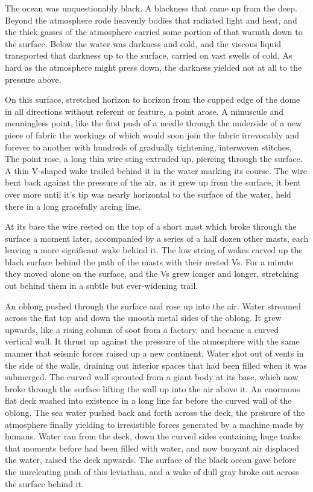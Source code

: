 \documentclass[
]{scrbook}
\begin{document}
The ocean was unquestionably black. A blackness that came up from the
deep. Beyond the atmosphere rode heavenly bodies that radiated light and
heat, and the thick gasses of the atmosphere carried some portion of
that warmth down to the surface. Below the water was darkness and cold,
and the viscous liquid transported that darkness up to the surface,
carried on vast swells of cold. As hard as the atmosphere might press
down, the darkness yielded not at all to the pressure above.

On this surface, stretched horizon to horizon from the cupped edge of
the dome in all directions without referent or feature, a point arose. A
minuscule and meaningless point, like the first push of a needle through
the underside of a new piece of fabric the workings of which would soon
join the fabric irrevocably and forever to another with hundreds of
gradually tightening, interwoven stitches. The point rose, a long thin
wire sting extruded up, piercing through the surface. A thin V-shaped
wake trailed behind it in the water marking its course. The wire bent
back against the pressure of the air, as it grew up from the surface, it
bent over more until it's tip was nearly horizontal to the surface of
the water, held there in a long gracefully arcing line.

At its base the wire rested on the top of a short mast which broke
through the surface a moment later, accompanied by a series of a half
dozen other masts, each leaving a more significant wake behind it. The
low string of wakes carved up the black surface behind the path of the
masts with their nested Vs. For a minute they moved alone on the
surface, and the Vs grew longer and longer, stretching out behind them
in a subtle but ever-widening trail.

An oblong pushed through the surface and rose up into the air. Water
streamed across the flat top and down the smooth metal sides of the
oblong. It grew upwards, like a rising column of soot from a factory,
and became a curved vertical wall. It thrust up against the pressure of
the atmosphere with the same manner that seismic forces raised up a new
continent. Water shot out of vents in the side of the walls, draining
out interior spaces that had been filled when it was submerged. The
curved wall sprouted from a giant body at its base, which now broke
through the surface lifting the wall up into the air above it. An
enormous flat deck washed into existence in a long line far before the
curved wall of the oblong. The sea water pushed back and forth across
the deck, the pressure of the atmosphere finally yielding to
irresistible forces generated by a machine made by humans. Water ran
from the deck, down the curved sides containing huge tanks that moments
before had been filled with water, and now buoyant air displaced the
water, raised the deck upwards. The surface of the black ocean gave
before the unrelenting push of this leviathan, and a wake of dull gray
broke out across the surface behind it.
\end{document}

